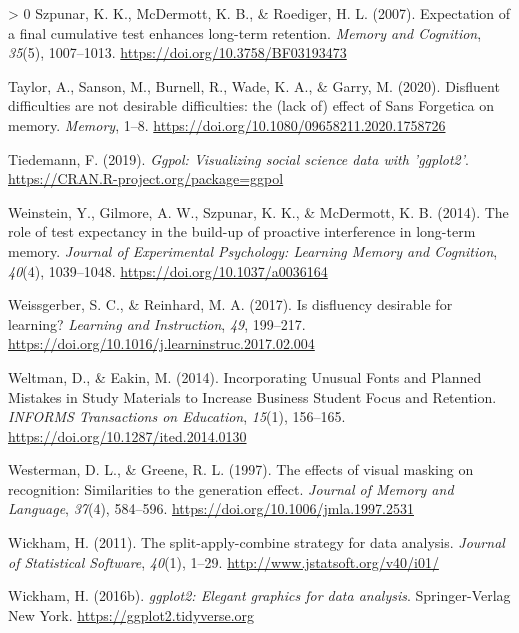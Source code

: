 \documentclass[
  english,
  jou]{apa7}
\newlength{\cslhangindent}
\newenvironment{CSLReferences}[3] %
 {%
  \setlength{\parindent}{0pt}
  \ifodd #1 \everypar{\setlength{\hangindent}{\cslhangindent}}\ignorespaces\fi
  \ifnum #2 > 0
  \setlength{\parskip}{#2\baselineskip}
  \fi
 }%
 {}
\begin{document}
\begin{CSLReferences}{1}{0}
\leavevmode\hypertarget{ref-Szpunar2007}{}%
Szpunar, K. K., McDermott, K. B., \& Roediger, H. L. (2007). {Expectation of a final cumulative test enhances long-term retention}. \emph{Memory and Cognition}, \emph{35}(5), 1007--1013. \url{https://doi.org/10.3758/BF03193473}

\leavevmode\hypertarget{ref-Taylor2020}{}%
Taylor, A., Sanson, M., Burnell, R., Wade, K. A., \& Garry, M. (2020). {Disfluent difficulties are not desirable difficulties: the (lack of) effect of Sans Forgetica on memory}. \emph{Memory}, 1--8. \url{https://doi.org/10.1080/09658211.2020.1758726}

\leavevmode\hypertarget{ref-R-ggpol}{}%
Tiedemann, F. (2019). \emph{Ggpol: Visualizing social science data with 'ggplot2'}. \url{https://CRAN.R-project.org/package=ggpol}

\leavevmode\hypertarget{ref-Weinstein2014}{}%
Weinstein, Y., Gilmore, A. W., Szpunar, K. K., \& McDermott, K. B. (2014). {The role of test expectancy in the build-up of proactive interference in long-term memory}. \emph{Journal of Experimental Psychology: Learning Memory and Cognition}, \emph{40}(4), 1039--1048. \url{https://doi.org/10.1037/a0036164}

\leavevmode\hypertarget{ref-Weissgerber2017}{}%
Weissgerber, S. C., \& Reinhard, M. A. (2017). {Is disfluency desirable for learning?} \emph{Learning and Instruction}, \emph{49}, 199--217. \url{https://doi.org/10.1016/j.learninstruc.2017.02.004}

\leavevmode\hypertarget{ref-Weltman2014}{}%
Weltman, D., \& Eakin, M. (2014). {Incorporating Unusual Fonts and Planned Mistakes in Study Materials to Increase Business Student Focus and Retention}. \emph{INFORMS Transactions on Education}, \emph{15}(1), 156--165. \url{https://doi.org/10.1287/ited.2014.0130}

\leavevmode\hypertarget{ref-Westerman1997}{}%
Westerman, D. L., \& Greene, R. L. (1997). {The effects of visual masking on recognition: Similarities to the generation effect.} \emph{Journal of Memory and Language}, \emph{37}(4), 584--596. \url{https://doi.org/10.1006/jmla.1997.2531}

\leavevmode\hypertarget{ref-R-plyr}{}%
Wickham, H. (2011). The split-apply-combine strategy for data analysis. \emph{Journal of Statistical Software}, \emph{40}(1), 1--29. \url{http://www.jstatsoft.org/v40/i01/}

\leavevmode\hypertarget{ref-R-ggplot2}{}%
Wickham, H. (2016b). \emph{ggplot2: Elegant graphics for data analysis}. Springer-Verlag New York. \url{https://ggplot2.tidyverse.org}


\end{CSLReferences}
\end{document}
